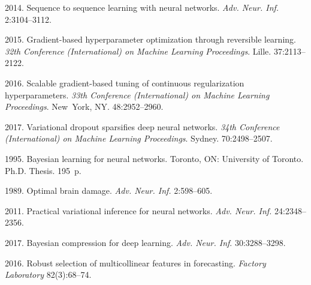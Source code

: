
  \begin{multicols}{2}

\renewcommand{\bibname}{\protect\rmfamily References}

{\small\frenchspacing
 {%
 \begin{thebibliography}{99}
 2014. 
Sequence to sequence learning with neural networks. 
\textit{Adv. Neur. Inf.} 2:3104--3112.

     2015. Gradient-based hyperparameter optimization through reversible learning. 
     \textit{32th  Conference (International) on Machine Learning Proceedings}. 
     Lille. 37:2113--2122.
    
     2016. 
    Scalable gradient-based tuning of continuous regularization hyperparameters. 
    \textit{33th Conference (International)
    on Machine Learning Proceedings}. New~York, NY. 48:2952--2960.

    2017. Variational dropout sparsifies deep neural networks. 
    \textit{34th Conference 
    (International) on Machine Learning Proceedings}. Sydney. 70:2498--2507.
    
     1995. Bayesian learning for neural networks. 
    Toronto, ON: University of Toronto. Ph.D. Thesis. 195~p. 
    
     1989. Optimal brain damage. 
    \textit{Adv. Neur. Inf.} 2:598--605.
    
    
    
      2011. Practical variational inference for neural networks.
     \textit{Adv. Neur. Inf.} 24:2348--2356.
     
    2017. Bayesian compression for deep learning. \textit{Adv. 
    Neur. Inf}. 30:3288--3298. 

    2016. Robust selection of multicollinear features in forecasting. 
    \textit{Factory Laboratory} 82(3):68--74.
    

\end{thebibliography}}}
\end{multicols}
